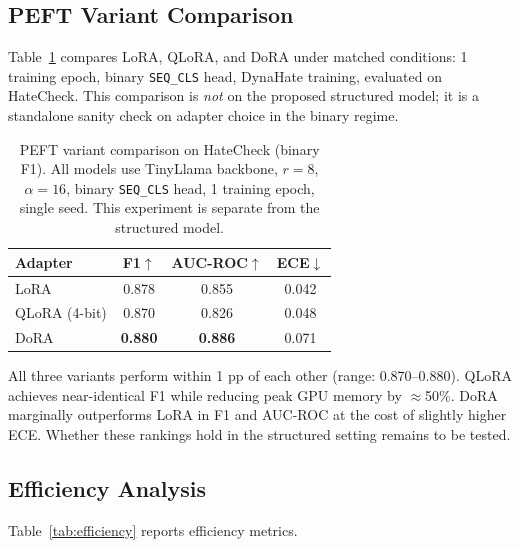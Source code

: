 \documentclass{article}
\newcommand{\tl}{TinyLlama\xspace}
\begin{document}
\subsection{PEFT Variant Comparison}

Table~\ref{tab:peft} compares LoRA, QLoRA, and DoRA under matched conditions:
1 training epoch, binary \texttt{SEQ\_CLS} head, DynaHate training, evaluated
on HateCheck.
This comparison is \emph{not} on the proposed structured model; it is a
standalone sanity check on adapter choice in the binary regime.

\begin{table}[t]
\centering
\caption{PEFT variant comparison on HateCheck (binary F1).
All models use \tl{} backbone, $r=8$, $\alpha=16$, binary \texttt{SEQ\_CLS} head,
1 training epoch, single seed.
This experiment is separate from the structured model.}
\label{tab:peft}
\small
\begin{tabular}{lccc}
\toprule
Adapter & F1$\uparrow$ & AUC-ROC$\uparrow$ & ECE$\downarrow$ \\
\midrule
LoRA & 0.878 & 0.855 & 0.042 \\
QLoRA (4-bit) & 0.870 & 0.826 & 0.048 \\
DoRA & \textbf{0.880} & \textbf{0.886} & 0.071 \\
\bottomrule
\end{tabular}
\end{table}

All three variants perform within 1 pp of each other (range: 0.870–0.880).
QLoRA achieves near-identical F1 while reducing peak GPU memory by $\approx$50\%.
DoRA marginally outperforms LoRA in F1 and AUC-ROC at the cost of slightly
higher ECE.
Whether these rankings hold in the structured setting remains to be tested.

\subsection{Efficiency Analysis}

Table~\ref{tab:efficiency} reports efficiency metrics.
\end{document}
